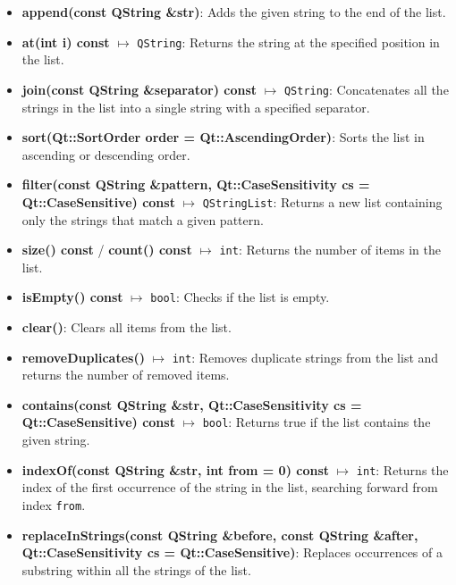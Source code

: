 \documentclass{report}
\begin{document}
    \pagebreak 
    \begin{itemize}
        \item \textbf{append(const QString \&str)}: Adds the given string to the end of the list.
        \item \textbf{at(int i) const} $\mapsto$ \texttt{QString}: Returns the string at the specified position in the list.
        \item \textbf{join(const QString \&separator) const} $\mapsto$ \texttt{QString}: Concatenates all the strings in the list into a single string with a specified separator.
        \item \textbf{sort(Qt::SortOrder order = Qt::AscendingOrder)}: Sorts the list in ascending or descending order.
        \item \textbf{filter(const QString \&pattern, Qt::CaseSensitivity cs = Qt::CaseSensitive) const} $\mapsto$ \texttt{QStringList}: Returns a new list containing only the strings that match a given pattern.
        \item \textbf{size() const} / \textbf{count() const} $\mapsto$ \texttt{int}: Returns the number of items in the list.
        \item \textbf{isEmpty() const} $\mapsto$ \texttt{bool}: Checks if the list is empty.
        \item \textbf{clear()}: Clears all items from the list.
        \item \textbf{removeDuplicates()} $\mapsto$ \texttt{int}: Removes duplicate strings from the list and returns the number of removed items.
        \item \textbf{contains(const QString \&str, Qt::CaseSensitivity cs = Qt::CaseSensitive) const} $\mapsto$ \texttt{bool}: Returns true if the list contains the given string.
        \item \textbf{indexOf(const QString \&str, int from = 0) const} $\mapsto$ \texttt{int}: Returns the index of the first occurrence of the string in the list, searching forward from index \texttt{from}.
        \item \textbf{replaceInStrings(const QString \&before, const QString \&after, Qt::CaseSensitivity cs = Qt::CaseSensitive)}: Replaces occurrences of a substring within all the strings of the list.
    \end{itemize}
\end{document}
